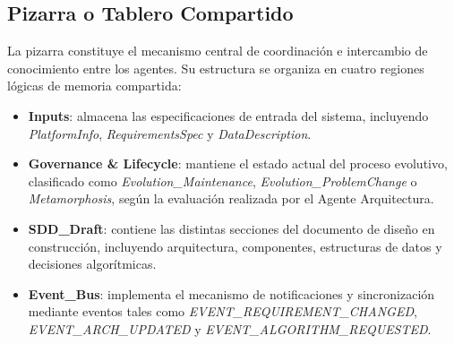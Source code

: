 \documentclass[12pt, letterpaper, oneside]{book}
\begin{document}
\subsection{Pizarra o Tablero Compartido} La pizarra constituye el mecanismo central de coordinación e intercambio de conocimiento entre los agentes. Su estructura se organiza en cuatro regiones lógicas de memoria compartida: \begin{itemize} \item \textbf{Inputs}: almacena las especificaciones de entrada del sistema, incluyendo \textit{PlatformInfo}, \textit{RequirementsSpec} y \textit{DataDescription}. \item \textbf{Governance \& Lifecycle}: mantiene el estado actual del proceso evolutivo, clasificado como \textit{Evolution\_Maintenance}, \textit{Evolution\_ProblemChange} o \textit{Metamorphosis}, según la evaluación realizada por el Agente Arquitectura. \item \textbf{SDD\_Draft}: contiene las distintas secciones del documento de diseño en construcción, incluyendo arquitectura, componentes, estructuras de datos y decisiones algorítmicas. \item \textbf{Event\_Bus}: implementa el mecanismo de notificaciones y sincronización mediante eventos tales como \textit{EVENT\_REQUIREMENT\_CHANGED}, \textit{EVENT\_ARCH\_UPDATED} y \textit{EVENT\_ALGORITHM\_REQUESTED}. \end{itemize}
\end{document}
